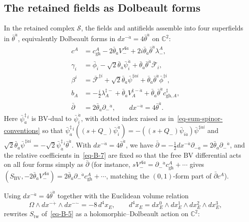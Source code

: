 \documentclass[11pt]{article}
\numberwithin{equation}{section}
\numberwithin{figure}{section}
\numberwithin{table}{section}
\begin{document}
\subsection{The retained fields as Dolbeault forms}\label{the-retained-fields}

In the retained complex $\mathcal S$, the fields and antifields assemble into four superfields in $\bar\theta^{\dot a}$, equivalently Dolbeault forms in $dx^{-\dot a}=4\bar\theta^{\dot a}$ on $\mathbb C^2$:
\begin{equation}\label{eq-B-7}
\begin{aligned}
c^A&=c_{\mathrm{gh}}^A-2\bar\theta_{\dot a}V_-^{A\dot a}
+2i\bar\theta_{\dot a}\bar\theta^{\dot a}\lambda_-^A,\\
\gamma_i&=\bar\phi_i-\sqrt2\bar\theta_{\dot a}\bar\psi_i^{\dot a}
+\bar\theta_{\dot a}\bar\theta^{\dot a}\bar{\mathcal F}_i,\\
\beta^i&=\bar{\mathcal F}^{\ddagger i}
+\sqrt2\bar\theta_{\dot a}\bar\psi^{\ddagger\dot ai}
+\bar\theta_{\dot a}\bar\theta^{\dot a}\bar\phi^{\ddagger i},\\
b_A&=-\frac i2\lambda_A^{\ddagger-}
+\bar\theta_{\dot a}V_A^{\ddagger-\dot a}
+\bar\theta_{\dot a}\bar\theta^{\dot a}c_{\mathrm{gh},A}^{\ddagger},\\
\bar\partial&=2\bar\theta_{\dot a}\partial_-{}^{\dot a},
\qquad dx^{-\dot a}=4\bar\theta^{\dot a}.
\end{aligned}
\end{equation}
Here $\bar\psi^\ddagger_{\dot a}{}^i$ is BV-dual to $\bar\psi_i^{\dot a}$, with dotted index raised as in~\eqref{eq-sum-spinor-conventions} so that $\bar\psi^\ddagger_{\dot a}{}^i((s+Q_-)\bar\psi_i^{\dot a})=-((s+Q_-)\bar\psi_{i\dot a})\bar\psi^{\ddagger\dot a i}$ and $\sqrt2\bar\theta_{\dot a}\bar\psi^{\ddagger\dot a i}=-\sqrt2\bar\psi^\ddagger_{\dot a}{}^i\bar\theta^{\dot a}$. With $dx^{-\dot a}=4\bar\theta^{\dot a}$, we have $\bar\partial=-\frac12dx^{-\dot a}\partial_{-\dot a}=2\bar\theta_{\dot a}\partial_-{}^{\dot a}$, and the relative coefficients in~\eqref{eq-B-7} are fixed so that the free BV differential acts on all four forms simply as $\bar\partial$ (for instance, $sV_-^{A\dot a}=\partial_-{}^{\dot a}c_{\mathrm{gh}}^A+\cdots$ gives $(S_{\mathrm{BV}},-2\bar\theta_{\dot a}V_-^{A\dot a})=2\bar\theta_{\dot a}\partial_-{}^{\dot a}c_{\mathrm{gh}}^A+\cdots$, matching the $(0,1)$-form part of $\bar\partial c^A$).

Using $dx^{-\dot a}=4\bar\theta^{\dot a}$ together with the Euclidean volume relation
\begin{equation}\label{b-00919}
\Omega\wedge dx^{-\dot+}\wedge dx^{-\dot-}=-8\,d^4x_E,
\qquad d^4x_E=dx_E^0\wedge dx_E^1\wedge dx_E^2\wedge dx_E^3,
\end{equation}
rewrites $S_{\mathrm{tw}}$ of~\eqref{eq-B-5} as a holomorphic--Dolbeault action on $\mathbb C^2$:
\end{document}

